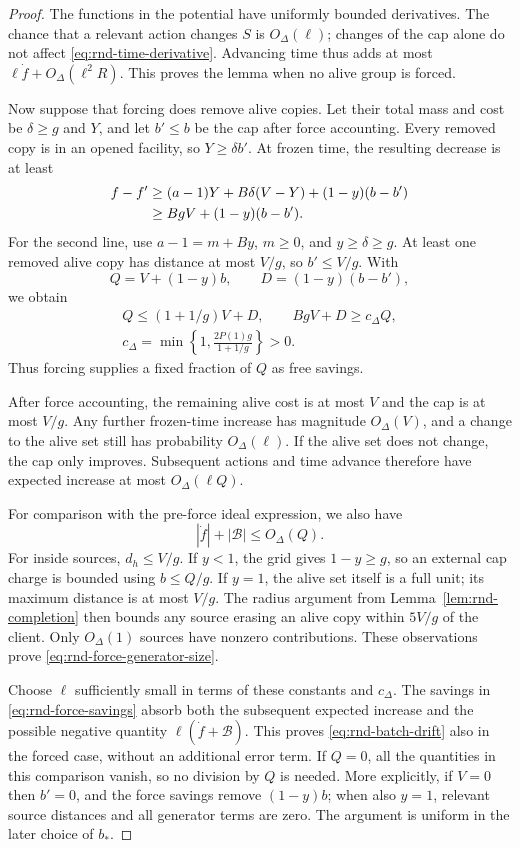 \begin{proof}
The functions in the potential have uniformly bounded derivatives.
The chance that a relevant action changes $S$ is $O_\Delta(\ell)$;
changes of the cap alone do not affect \eqref{eq:rnd-time-derivative}.
Advancing time thus adds at most
$\ell\dot f+O_\Delta(\ell^2R)$.  This proves the lemma when no alive
group is forced.

Now suppose that forcing does remove alive copies.  Let their total
mass and cost be $\delta\ge g$ and $Y$, and let $b'\le b$ be the
cap after force accounting.  Every removed copy is in an opened
facility, so $Y\ge\delta b'$.  At frozen time, the resulting decrease
is at least
\begin{align}
 f-f'
 &\ge(a-1)Y+B\delta(V-Y)+(1-y)(b-b')\notag\\
 &\ge BgV+(1-y)(b-b').\label{eq:rnd-force-savings}
\end{align}
For the second line, use $a-1=m+By$, $m\ge0$, and
$y\ge\delta\ge g$.  At least one removed alive copy has distance
at most $V/g$, so $b'\le V/g$.  With
\[
 Q=V+(1-y)b,\qquad D=(1-y)(b-b'),
\]
we obtain
\[
 \begin{gathered}
 Q\le(1+1/g)V+D,\qquad BgV+D\ge c_\Delta Q,\\
 c_\Delta=\min\left\{1,\frac{2P(1)g}{1+1/g}\right\}>0.
 \end{gathered}
\]
Thus forcing supplies a fixed fraction of $Q$ as free savings.

After force accounting, the remaining alive cost is at most $V$ and
the cap is at most $V/g$.  Any further frozen-time increase has
magnitude $O_\Delta(V)$, and a change to the alive set still has
probability $O_\Delta(\ell)$.  If the alive set does not change, the
cap only improves.  Subsequent actions and time advance therefore
have expected increase at most $O_\Delta(\ell Q)$.

For comparison with the pre-force ideal expression, we also have
\begin{equation}\label{eq:rnd-force-generator-size}
 |\dot f|+|\mathcal B|\le O_\Delta(Q).
\end{equation}
For inside sources, $d_h\le V/g$.  If $y<1$, the grid gives
$1-y\ge g$, so an external cap charge is bounded using $b\le Q/g$.
If $y=1$, the alive set itself is a full unit; its maximum distance
is at most $V/g$.  The radius argument from
Lemma~\ref{lem:rnd-completion} then bounds any source erasing an alive
copy within $5V/g$ of the client.  Only $O_\Delta(1)$ sources have
nonzero contributions.  These observations prove
\eqref{eq:rnd-force-generator-size}.

Choose $\ell$ sufficiently small in terms of these constants and
$c_\Delta$.  The savings in \eqref{eq:rnd-force-savings} absorb both
the subsequent expected increase and the possible negative quantity
$\ell(\dot f+\mathcal B)$.  This proves
\eqref{eq:rnd-batch-drift} also in the forced case, without an
additional error term.  If $Q=0$, all the quantities in this
comparison vanish, so no division by $Q$ is needed.  More explicitly,
if $V=0$ then $b'=0$, and the force savings remove $(1-y)b$; when
also $y=1$, relevant source distances and all generator terms are
zero.  The argument is uniform in the later choice of $b_*$.
\end{proof}

